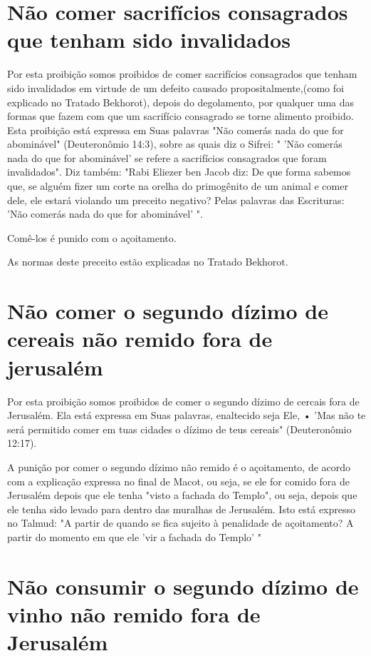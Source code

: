 \section{Não comer sacrifícios consagrados que tenham sido invalidados}

Por esta proibição somos proibidos de comer sacrifícios consagra­dos que
tenham sido invalidados em virtude de um defeito causado
proposital­mente,(como foi explicado no Tratado Bekhorot), depois do
degolamento, por
qualquer uma das formas que fazem com que um sacrifício consagrado se
tor­ne alimento proibido. Esta proibição está expressa em Suas palavras
"Não co­merás nada do que for abominável" (Deuteronômio 14:3), sobre as
quais diz o Sifrei: " 'Não comerás nada do que for abominável' se refere
a sacrifícios con­sagrados que foram invalidados". Diz também: "Rabi
Eliezer ben Jacob diz: De que forma sabemos que, se alguém fizer um
corte na orelha do primogênito de um animal e comer dele, ele estará
violando um preceito negativo? Pelas palavras das Escrituras: 'Não
comerás nada do que for abominável' ".

Comê-los é punido com o açoitamento.


As normas deste preceito estão explicadas no Tratado Bekhorot.

\section{Não comer o segundo dízimo de cereais não remido fora de jerusalém}

Por esta proibição somos proibidos de comer o segundo dízimo de cercais
fora de Jerusalém. Ela está expressa em Suas palavras, enaltecido seja
Ele, • 'Mas não te será permitido comer em tuas cidades o dízimo de teus
ce­reais" (Deuteronômio 12:17).

A punição por comer o segundo dízimo não remido é o açoitamento, de
acordo com a explicação expressa no final de Macot, ou seja, se ele for
comi­do fora de Jerusalém depois que ele tenha "visto a fachada do
Templo", ou seja, depois que ele tenha sido levado para dentro das
muralhas de Jerusalém. Isto está expresso no Talmud: "A partir de quando
se fica sujeito à penalidade de açoitamento? A partir do momento em que
ele 'vir a fachada do Templo' "

\section{Não consumir o segundo dízimo de vinho não remido fora de Jerusalém}

